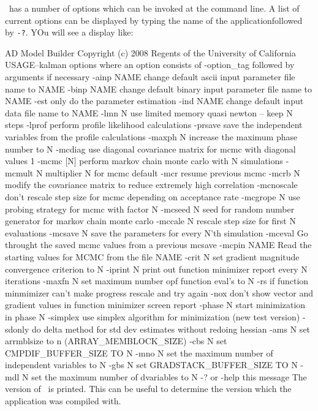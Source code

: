 %
%

\ADM\ has a number of options which can be invoked at the command line.
A list of current options can be displayed by typing the name of the applicationfollowed by {\tt -?}. YOu will see a display like:

\beginexample
 AD Model Builder Copyright (c) 2008 Regents of the University of California
 USAGE--kalman options
 where an option consists of -option_tag followed by arguments if necessary
 -ainp NAME      change default ascii input parameter file name to NAME
 -binp NAME      change default binary input parameter file name to NAME
 -est            only do the parameter estimation
 -ind NAME       change default input data file name to NAME
 -lmn N          use limited memory quasi newton -- keep N steps
 -lprof          perform profile likelihood calculations
 -prsave         save the independent variables from the profile calculations
 -maxph N        increase the maximum phase number to N
 -mcdiag         use diagonal covariance matrix for mcmc with diagonal values 1
 -mcmc [N]       perform markov chain monte carlo with N simulations
 -mcmult N       multiplier N for mcmc default
 -mcr            resume previous mcmc
 -mcrb N         modify the covariance matrix to reduce extremely high correlation      
 -mcnoscale      don't rescale step size for mcmc depending on acceptance rate
 -mcgrope N      use probing strategy for mcmc with factor N
 -mcseed N       seed for random number generator for markov chain monte carlo
 -mccale N       rescale step size for first N evaluations
 -mcsave N       save the parameters for every N'th simulation
 -mceval         Go throught the saved mcmc values from a previous mcsave
 -mcpin NAME      Read the starting values for MCMC from the file NAME
 -crit N         set gradient magnitude convergence criterion to N
 -iprint N       print out function minimizer report every N iterations
 -maxfn N        set maximum number opf function eval's to N
 -rs             if function minmimizer can't make progress rescale and try again
 -nox            don't show vector and gradient values in function minimizer screen report
 -phase N        start minimization in phase N
 -simplex        use simplex algorithm for minimization (new test version)
 -sdonly         do delta method for std dev estimates without redoing hessian
 -ams N          set arrmblsize to n (ARRAY_MEMBLOCK_SIZE) 
 -cbs N          set CMPDIF_BUFFER_SIZE TO N 
 -mno N          set the maximum number of independent variables to N
 -gbs N          set GRADSTACK_BUFFER_SIZE TO N 
 -mdl N          set the maximum number of dvariables to N
 -? or -help     this message
\endexample
The version of \ADM\ is printed. This can be useful to determine
the version which the application was compiled with.

